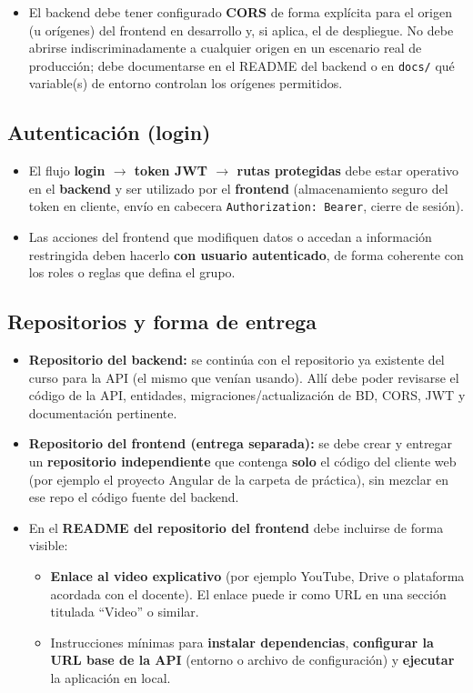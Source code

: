 \documentclass[11pt,a4paper]{article}
\begin{document}
\begin{itemize}[leftmargin=*]
  \item El backend debe tener configurado \textbf{CORS} de forma explícita para el origen (u orígenes) del frontend en desarrollo y, si aplica, el de despliegue. No debe abrirse indiscriminadamente a cualquier origen en un escenario real de producción; debe documentarse en el README del backend o en \texttt{docs/} qué variable(s) de entorno controlan los orígenes permitidos.
\end{itemize}

\subsection{Autenticación (login)}

\begin{itemize}[leftmargin=*]
  \item El flujo \textbf{login $\rightarrow$ token JWT $\rightarrow$ rutas protegidas} debe estar operativo en el \textbf{backend} y ser utilizado por el \textbf{frontend} (almacenamiento seguro del token en cliente, envío en cabecera \texttt{Authorization: Bearer}, cierre de sesión).
  \item Las acciones del frontend que modifiquen datos o accedan a información restringida deben hacerlo \textbf{con usuario autenticado}, de forma coherente con los roles o reglas que defina el grupo.
\end{itemize}

\subsection{Repositorios y forma de entrega}

\begin{itemize}[leftmargin=*]
  \item \textbf{Repositorio del backend:} se continúa con el repositorio ya existente del curso para la API (el mismo que venían usando). Allí debe poder revisarse el código de la API, entidades, migraciones/actualización de BD, CORS, JWT y documentación pertinente.
  \item \textbf{Repositorio del frontend (entrega separada):} se debe crear y entregar un \textbf{repositorio independiente} que contenga \textbf{solo} el código del cliente web (por ejemplo el proyecto Angular de la carpeta de práctica), sin mezclar en ese repo el código fuente del backend.
  \item En el \textbf{README del repositorio del frontend} debe incluirse de forma visible:
  \begin{itemize}
    \item \textbf{Enlace al video explicativo} (por ejemplo YouTube, Drive o plataforma acordada con el docente). El enlace puede ir como URL en una sección titulada ``Video'' o similar.
    \item Instrucciones mínimas para \textbf{instalar dependencias}, \textbf{configurar la URL base de la API} (entorno o archivo de configuración) y \textbf{ejecutar} la aplicación en local.
  \end{itemize}
\end{itemize}
\end{document}
